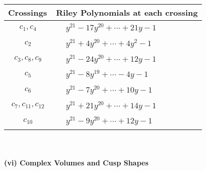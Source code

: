 \documentclass[1p]{elsarticle_modified}
\theoremstyle{definition}
\begin{document}
\begin{tabular}{m{50pt}|m{274pt}}
Crossings & \hspace{64pt}Riley Polynomials at each crossing \\
\hline $$\begin{aligned}c_{1},c_{4}\end{aligned}$$&$\begin{aligned}
&y^{21}-17 y^{20}+\cdots+21 y-1
\end{aligned}$\\
\hline $$\begin{aligned}c_{2}\end{aligned}$$&$\begin{aligned}
&y^{21}+4 y^{20}+\cdots+4 y^2-1
\end{aligned}$\\
\hline $$\begin{aligned}c_{3},c_{8},c_{9}\end{aligned}$$&$\begin{aligned}
&y^{21}-24 y^{20}+\cdots+12 y-1
\end{aligned}$\\
\hline $$\begin{aligned}c_{5}\end{aligned}$$&$\begin{aligned}
&y^{21}-8 y^{19}+\cdots-4 y-1
\end{aligned}$\\
\hline $$\begin{aligned}c_{6}\end{aligned}$$&$\begin{aligned}
&y^{21}-7 y^{20}+\cdots+10 y-1
\end{aligned}$\\
\hline $$\begin{aligned}c_{7},c_{11},c_{12}\end{aligned}$$&$\begin{aligned}
&y^{21}+21 y^{20}+\cdots+14 y-1
\end{aligned}$\\
\hline $$\begin{aligned}c_{10}\end{aligned}$$&$\begin{aligned}
&y^{21}-9 y^{20}+\cdots+12 y-1
\end{aligned}$\\
\hline
\end{tabular}\\~\\
\newpage\flushleft \textbf{(vi) Complex Volumes and Cusp Shapes}
\end{document}
